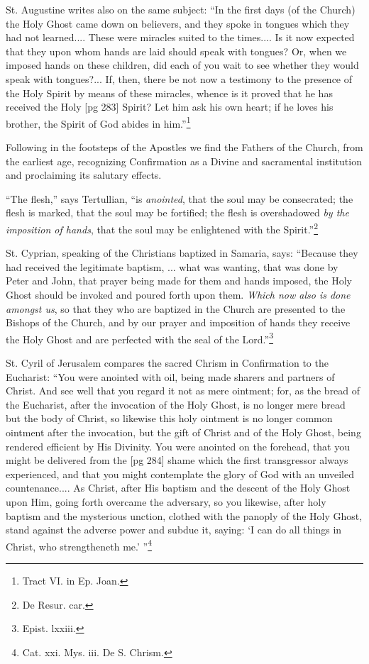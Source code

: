 St. Augustine writes also on the same subject:
“In the first days (of the Church) the Holy Ghost
came down on believers, and they spoke in tongues
which they had not learned.... These were
miracles suited to the times.... Is it now expected
that they upon whom hands are laid should
speak with tongues? Or, when we imposed hands
on these children, did each of you wait to see
whether they would speak with tongues?... If,
then, there be not now a testimony to the presence
of the Holy Spirit by means of these miracles,
whence is it proved that he has received the Holy
[pg 283]
Spirit? Let him ask his own heart; if he loves his
brother, the Spirit of God abides in him.”\footnote{Tract
VI. in Ep. Joan.}

Following in the footsteps of the Apostles we
find the Fathers of the Church, from the earliest
age, recognizing Confirmation as a Divine and
sacramental institution and proclaiming its salutary
effects.

“The flesh,” says Tertullian, “is \emph{anointed}, that
the soul may be consecrated; the flesh is marked,
that the soul may be fortified; the flesh is overshadowed
\emph{by the imposition of hands}, that the soul
may be enlightened with the Spirit.”\footnote{De Resur. car.}

St. Cyprian, speaking of the Christians baptized
in Samaria, says: “Because they had received the
legitimate baptism, ... what was wanting, that
was done by Peter and John, that prayer being
made for them and hands imposed, the Holy Ghost
should be invoked and poured forth upon them.
\emph{Which now also is done amongst us}, so that they
who are baptized in the Church are presented to
the Bishops of the Church, and by our prayer and
imposition of hands they receive the Holy Ghost
and are perfected with the seal of the Lord.”\footnote{Epist. lxxiii.}

St. Cyril of Jerusalem compares the sacred
Chrism in Confirmation to the Eucharist: “You
were anointed with oil, being made sharers and
partners of Christ. And see well that you regard
it not as mere ointment; for, as the bread of the
Eucharist, after the invocation of the Holy Ghost,
is no longer mere bread but the body of Christ, so
likewise this holy ointment is no longer common
ointment after the invocation, but the gift of
Christ and of the Holy Ghost, being rendered
efficient by His Divinity. You were anointed on
the forehead, that you might be delivered from the
[pg 284]
shame which the first transgressor always experienced,
and that you might contemplate the glory
of God with an unveiled countenance.... As
Christ, after His baptism and the descent of the
Holy Ghost upon Him, going forth overcame the
adversary, so you likewise, after holy baptism and
the mysterious unction, clothed with the panoply
of the Holy Ghost, stand against the adverse
power and subdue it, saying: ‘I can do all things
in Christ, who strengtheneth me.’ ”\footnote{Cat.
xxi. Mys. iii. De S. Chrism.}

